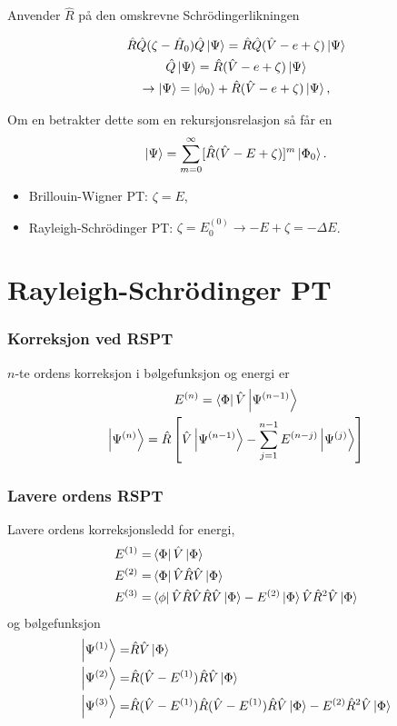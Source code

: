 \documentclass{beamer}
\begin{document}
\begin{frame}
	Anvender $\hat R$ på den omskrevne Schrödingerlikningen

	\begin{gather}
		\hat R \hat Q (\zeta  - \hat H_0) \hat Q \ket{\Psi} = \hat R \hat Q(\hat V - e + \zeta)\ket{\Psi} \\
		\hat Q\ket{\Psi} = \hat R(\hat V - e + \zeta)\ket{\Psi} \\
		\rightarrow \ket{\Psi} = \ket{\phi_0} + \hat R(\hat V - e + \zeta)\ket{\Psi}, 
	\end{gather}
	
	Om en betrakter dette som en rekursjonsrelasjon så får en
	\begin{equation}
		\ket{\Psi} = \sum_{m=0}^\infty [\hat R(\hat V - E + \zeta)]^m \ket{\Phi_0}.
	\end{equation}
	
	\begin{itemize}
		\item Brillouin-Wigner PT: $\zeta = E$,
		\item Rayleigh-Schrödinger PT: $\zeta = E_0^{(0)} \to -E + \zeta = - \Delta E$.  	
	\end{itemize}

\end{frame}

\section{Rayleigh-Schrödinger PT}

\begin{frame}
	\frametitle{Korreksjon ved RSPT}
	$n$-te ordens korreksjon i bølgefunksjon og energi er
	\begin{gather}
		E^{(n)} = \bra{\Phi}\hat V \ket{\Psi^{(n-1)}}\\
		\ket{\Psi^{(n)}} = \hat R \left[\hat V \ket{\Psi^{(n-1)}} - \sum_{j=1}^{n-1}E^{(n-j)}\ket{\Psi^{(j)}} \right]
	\end{gather}

\end{frame}
	

\begin{frame}
	
	\frametitle{Lavere ordens RSPT}
	Lavere ordens korreksjonsledd for energi,
	\begin{align}
		E^{(1)} =& \bra{\Phi} \hat V \ket{\Phi} \\
		E^{(2)} =& \bra{\Phi} \hat V \hat R \hat V \ket{\Phi} \\
		E^{(3)} =& \bra{\phi} \hat V \hat R \hat V \hat R \hat V \ket{\Phi} - E^{(2)}\ket{\Phi} \hat V \hat R^2 \hat V \ket{\Phi}
	\end{align}
	og bølgefunksjon
	\begin{align}
		\ket{\Psi^{(1)}} =& \hat R \hat V \ket{\Phi} \\
		\ket{\Psi^{(2)}} =& \hat R (\hat V - E^{(1)}) \hat R \hat V\ket{\Phi} \\
		\ket{\Psi^{(3)}} =& \hat R (\hat V - E^{(1)}) \hat R (\hat V - E^{(1)}) \hat R \hat V \ket{\Phi} - E^{(2)}\hat R^2 \hat V\ket{\Phi}
	\end{align}
	
\end{frame}
\end{document}
